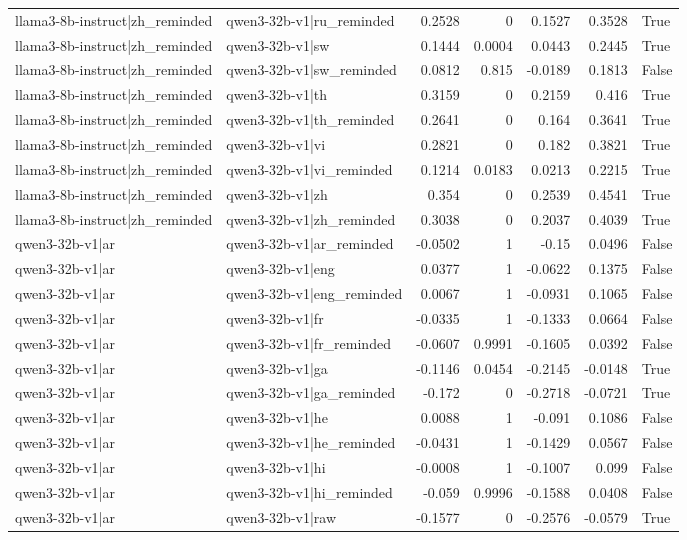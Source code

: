\begin{table}
\begin{tabular}{l l r r r r l}
llama3-8b-instruct|zh_reminded & qwen3-32b-v1|ru_reminded & 0.2528 & 0 & 0.1527 & 0.3528 & True \\
llama3-8b-instruct|zh_reminded & qwen3-32b-v1|sw & 0.1444 & 0.0004 & 0.0443 & 0.2445 & True \\
llama3-8b-instruct|zh_reminded & qwen3-32b-v1|sw_reminded & 0.0812 & 0.815 & -0.0189 & 0.1813 & False \\
llama3-8b-instruct|zh_reminded & qwen3-32b-v1|th & 0.3159 & 0 & 0.2159 & 0.416 & True \\
llama3-8b-instruct|zh_reminded & qwen3-32b-v1|th_reminded & 0.2641 & 0 & 0.164 & 0.3641 & True \\
llama3-8b-instruct|zh_reminded & qwen3-32b-v1|vi & 0.2821 & 0 & 0.182 & 0.3821 & True \\
llama3-8b-instruct|zh_reminded & qwen3-32b-v1|vi_reminded & 0.1214 & 0.0183 & 0.0213 & 0.2215 & True \\
llama3-8b-instruct|zh_reminded & qwen3-32b-v1|zh & 0.354 & 0 & 0.2539 & 0.4541 & True \\
llama3-8b-instruct|zh_reminded & qwen3-32b-v1|zh_reminded & 0.3038 & 0 & 0.2037 & 0.4039 & True \\
qwen3-32b-v1|ar & qwen3-32b-v1|ar_reminded & -0.0502 & 1 & -0.15 & 0.0496 & False \\
qwen3-32b-v1|ar & qwen3-32b-v1|eng & 0.0377 & 1 & -0.0622 & 0.1375 & False \\
qwen3-32b-v1|ar & qwen3-32b-v1|eng_reminded & 0.0067 & 1 & -0.0931 & 0.1065 & False \\
qwen3-32b-v1|ar & qwen3-32b-v1|fr & -0.0335 & 1 & -0.1333 & 0.0664 & False \\
qwen3-32b-v1|ar & qwen3-32b-v1|fr_reminded & -0.0607 & 0.9991 & -0.1605 & 0.0392 & False \\
qwen3-32b-v1|ar & qwen3-32b-v1|ga & -0.1146 & 0.0454 & -0.2145 & -0.0148 & True \\
qwen3-32b-v1|ar & qwen3-32b-v1|ga_reminded & -0.172 & 0 & -0.2718 & -0.0721 & True \\
qwen3-32b-v1|ar & qwen3-32b-v1|he & 0.0088 & 1 & -0.091 & 0.1086 & False \\
qwen3-32b-v1|ar & qwen3-32b-v1|he_reminded & -0.0431 & 1 & -0.1429 & 0.0567 & False \\
qwen3-32b-v1|ar & qwen3-32b-v1|hi & -0.0008 & 1 & -0.1007 & 0.099 & False \\
qwen3-32b-v1|ar & qwen3-32b-v1|hi_reminded & -0.059 & 0.9996 & -0.1588 & 0.0408 & False \\
qwen3-32b-v1|ar & qwen3-32b-v1|raw & -0.1577 & 0 & -0.2576 & -0.0579 & True \\

\end{tabular}
\end{table}
